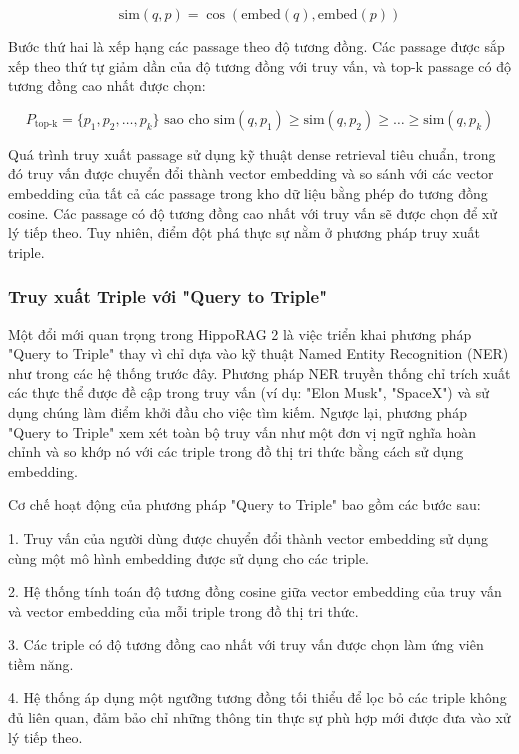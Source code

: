 \documentclass[../main.tex]{subfiles}
\begin{document}
\begin{equation}
\text{sim}(q, p) = \cos(\text{embed}(q), \text{embed}(p))
\end{equation}

Bước thứ hai là xếp hạng các passage theo độ tương đồng. Các passage được sắp xếp theo thứ tự giảm dần của độ tương đồng với truy vấn, và top-k passage có độ tương đồng cao nhất được chọn:

\begin{equation}
P_{\text{top-k}} = \{p_1, p_2, \ldots, p_k\} \text{ sao cho } \text{sim}(q, p_1) \geq \text{sim}(q, p_2) \geq \ldots \geq \text{sim}(q, p_k)
\end{equation}


Quá trình truy xuất passage sử dụng kỹ thuật dense retrieval tiêu chuẩn, trong đó truy vấn được chuyển đổi thành vector embedding và so sánh với các vector embedding của tất cả các passage trong kho dữ liệu bằng phép đo tương đồng cosine. Các passage có độ tương đồng cao nhất với truy vấn sẽ được chọn để xử lý tiếp theo. Tuy nhiên, điểm đột phá thực sự nằm ở phương pháp truy xuất triple.
\subsubsection{Truy xuất Triple với "Query to Triple"}
Một đổi mới quan trọng trong HippoRAG 2 là việc triển khai phương pháp "Query to Triple" thay vì chỉ dựa vào kỹ thuật Named Entity Recognition (NER) như trong các hệ thống trước đây. Phương pháp NER truyền thống chỉ trích xuất các thực thể được đề cập trong truy vấn (ví dụ: "Elon Musk", "SpaceX") và sử dụng chúng làm điểm khởi đầu cho việc tìm kiếm. Ngược lại, phương pháp "Query to Triple" xem xét toàn bộ truy vấn như một đơn vị ngữ nghĩa hoàn chỉnh và so khớp nó với các triple trong đồ thị tri thức bằng cách sử dụng embedding.

Cơ chế hoạt động của phương pháp "Query to Triple" bao gồm các bước sau:

1. Truy vấn của người dùng được chuyển đổi thành vector embedding sử dụng cùng một mô hình embedding được sử dụng cho các triple.

2. Hệ thống tính toán độ tương đồng cosine giữa vector embedding của truy vấn và vector embedding của mỗi triple trong đồ thị tri thức.

3. Các triple có độ tương đồng cao nhất với truy vấn được chọn làm ứng viên tiềm năng.

4. Hệ thống áp dụng một ngưỡng tương đồng tối thiểu để lọc bỏ các triple không đủ liên quan, đảm bảo chỉ những thông tin thực sự phù hợp mới được đưa vào xử lý tiếp theo.
\end{document}
